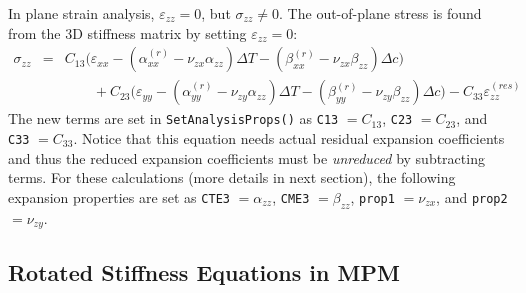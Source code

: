 \documentclass[11pt]{article}
\def\a#1{\alpha_{#1}}
\def\b#1{\beta_{#1}}
\def\code#1{{\small\tt #1}}
\def\DT{\Delta T}
\def\e#1{\varepsilon_{#1}}
\def\er#1{\varepsilon_{#1}^{(res)}}
\def\s#1{\sigma_{#1}}
\def\v#1{\nu_{#1}}
\begin{document}
In plane strain analysis, $\e{zz}=0$, but $\s{zz}\ne0$. The out-of-plane stress is found from the 3D stiffness matrix by setting $\e{zz}=0$:
\begin{eqnarray}
            \s{zz} & = & C_{13}\bigl(\e{xx} -(\a{xx}^{(r)}-\v{zx}\a{zz})\DT - (\b{xx}^{(r)}-\v{zx}\b{zz})\Delta c\bigr)
 \nonumber\\
 &&\qquad\mbox{}
                     +C_{23}\bigl(\e{yy} -(\a{yy}^{(r)}-\v{zy}\a{zz})\DT-(\b{yy}^{(r)}-\v{zy}\b{zz})\Delta c\bigr) 
                     -C_{33} \er{zz}
\end{eqnarray}
The new terms are set in \code{SetAnalysisProps()} as \code{C13} $=C_{13}$, \code{C23} $=C_{23}$, and \code{C33} $=C_{33}$. Notice that this equation needs actual residual expansion coefficients and thus the reduced expansion coefficients must be {\em unreduced} by subtracting terms. For these calculations (more details in next section), the following expansion properties are set as \code{CTE3} $=\a{zz}$, \code{CME3} $=\b{zz}$, \code{prop1} $=\v{zx}$, and \code{prop2} $=\v{zy}$.

\subsection{Rotated Stiffness Equations in MPM}
\end{document}
